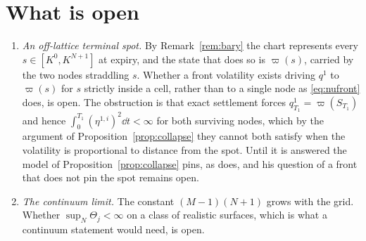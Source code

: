 \section{What is open}\label{sec:open}

\begin{enumerate}[leftmargin=1.6em,itemsep=0.4em]
\item \emph{An off-lattice terminal spot.} By Remark~\ref{rem:bary} the chart
represents every $s\in[K^0,K^{N+1}]$ at expiry, and the state that does so is
$\varpi(s)$, carried by the two nodes straddling $s$. Whether a front volatility
exists driving $q^1$ to $\varpi(s)$ for $s$ strictly inside a cell, rather than to
a single node as \eqref{eq:nufront} does, is open. The obstruction is that
exact settlement forces $q^1_{T_1}=\varpi(S_{T_1})$ and hence
$\int_0^{T_1}(\eta^{1,i})^2\dd t<\infty$ for both surviving nodes, which by the
argument of Proposition~\ref{prop:collapse} they cannot both satisfy when the
volatility is proportional to distance from the spot. Until it is answered the
model of Proposition~\ref{prop:collapse} pins, as \cite{Wissel2007} does, and
his question of a front that does not pin the spot remains open.

\item \emph{The continuum limit.} The constant $(M-1)(N+1)$ grows with the grid. Whether $\sup_N\Theta_j<\infty$ on a class of
realistic surfaces, which is what a continuum statement would need, is open.
\end{enumerate}
